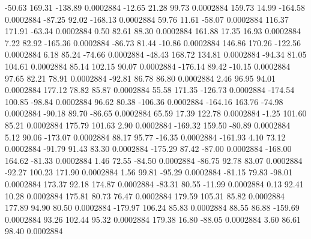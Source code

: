       -50.63      169.31     -138.89     0.0002884
      -12.65       21.28       99.73     0.0002884
      159.73       14.99     -164.58     0.0002884
      -87.25       92.02     -168.13     0.0002884
       59.76       11.61      -58.07     0.0002884
      116.37      171.91      -63.34     0.0002884
        0.50       82.61       88.30     0.0002884
      161.88       17.35       16.93     0.0002884
        7.22       82.92     -165.36     0.0002884
      -86.73       81.44      -10.86     0.0002884
      146.86      170.26     -122.56     0.0002884
        6.18       85.24      -74.66     0.0002884
      -48.43      168.72      134.81     0.0002884
      -94.34       81.05      104.61     0.0002884
       85.14      102.15       90.07     0.0002884
     -176.14       89.42      -10.15     0.0002884
       97.65       82.21       78.91     0.0002884
      -92.81       86.78       86.80     0.0002884
        2.46       96.95       94.01     0.0002884
      177.12       78.82       85.87     0.0002884
       55.58      171.35     -126.73     0.0002884
     -174.54      100.85      -98.84     0.0002884
       96.62       80.38     -106.36     0.0002884
     -164.16      163.76      -74.98     0.0002884
      -90.18       89.70      -86.65     0.0002884
       65.59       17.39      122.78     0.0002884
       -1.25      101.60       85.21     0.0002884
      175.79      101.63        2.90     0.0002884
     -169.32      159.50      -80.89     0.0002884
        5.12       90.06     -173.07     0.0002884
       88.17       95.77      -16.35     0.0002884
     -161.93        4.10       73.12     0.0002884
      -91.79       91.43       83.30     0.0002884
     -175.29       87.42      -87.00     0.0002884
     -168.00      164.62      -81.33     0.0002884
        1.46       72.55      -84.50     0.0002884
      -86.75       92.78       83.07     0.0002884
      -92.27      100.23      171.90     0.0002884
        1.56       99.81      -95.29     0.0002884
      -81.15       79.83      -98.01     0.0002884
      173.37       92.18      174.87     0.0002884
      -83.31       80.55      -11.99     0.0002884
        0.13       92.41       10.28     0.0002884
      175.81       80.73       76.47     0.0002884
      179.59      105.31       85.82     0.0002884
      177.89       94.90       80.50     0.0002884
     -179.97      106.24       85.83     0.0002884
       88.55       86.88     -159.69     0.0002884
       93.26      102.44       95.32     0.0002884
      179.38       16.80      -88.05     0.0002884
        3.60       86.61       98.40     0.0002884
